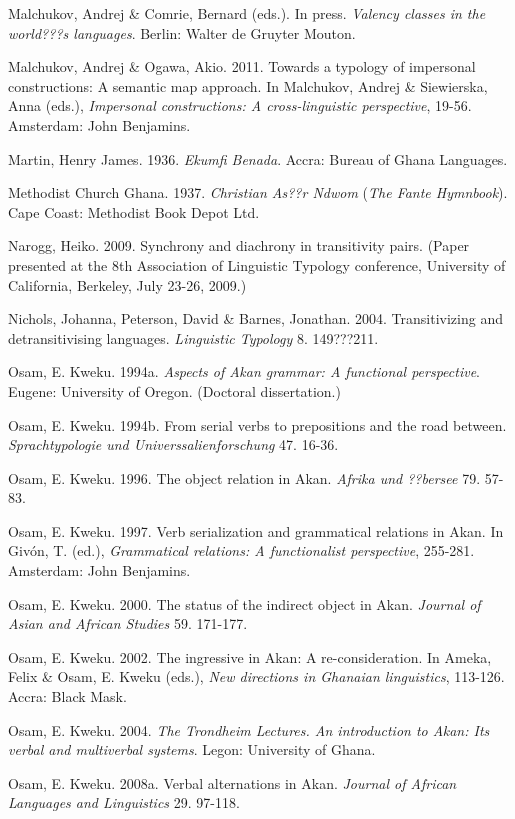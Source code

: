 \documentclass[output=paper]{langsci/langscibook}
\begin{document}
Malchukov, Andrej \& Comrie, Bernard (eds.). In press. \textit{Valency classes in the world???s languages}. Berlin: Walter de Gruyter Mouton.

Malchukov, Andrej \& Ogawa, Akio. 2011. Towards a typology of impersonal constructions: A semantic map approach. In Malchukov, Andrej \& Siewierska, Anna (eds.), \textit{Impersonal constructions: A cross-linguistic perspective}, 19-56. Amsterdam: John Benjamins.

Martin, Henry James. 1936. \emph{Ekumfi Benada}. Accra: Bureau of Ghana Languages.

Methodist Church Ghana. 1937. \textit{Christian As??r Ndwom }(\textit{The Fante Hymnbook}). Cape Coast: Methodist Book Depot Ltd.

Narogg, Heiko. 2009. Synchrony and diachrony in transitivity pairs. (Paper presented at the 8th Association of Linguistic Typology conference, University of California, Berkeley, July 23-26, 2009.)

Nichols, Johanna, Peterson, David \& Barnes, Jonathan. 2004. Transitivizing and detransitivising languages. \textit{Linguistic Typology} 8. 149???211.

Osam, E. Kweku. 1994a. \textit{Aspects of Akan grammar: A functional perspective}. Eugene: University of Oregon. (Doctoral dissertation.)

Osam, E. Kweku. 1994b. From serial verbs to prepositions and the road between. \textit{Sprachtypologie und Universsalienforschung} 47. 16-36.

Osam, E. Kweku. 1996. The object relation in Akan. \textit{Afrika und ??bersee} 79. 57-83.

Osam, E. Kweku. 1997. Verb serialization and grammatical relations in Akan. In Giv\'{o}n, T. (ed.), \textit{Grammatical relations: A functionalist perspective}, 255-281. Amsterdam: John Benjamins.

Osam, E. Kweku. 2000. The status of the indirect object in Akan. \textit{Journal of Asian and African Studies }59. 171-177.

Osam, E. Kweku. 2002. The ingressive in Akan: A re-consideration. In Ameka, Felix \& Osam, E. Kweku (eds.), \textit{New directions in Ghanaian linguistics}, 113-126. Accra: Black Mask.

Osam, E. Kweku. 2004. \textit{The Trondheim Lectures. An introduction to Akan: Its verbal and multiverbal systems}. Legon: University of Ghana.

Osam, E. Kweku. 2008a. Verbal alternations in Akan. \textit{Journal of African Languages and Linguistics} 29. 97-118.
\end{document}
